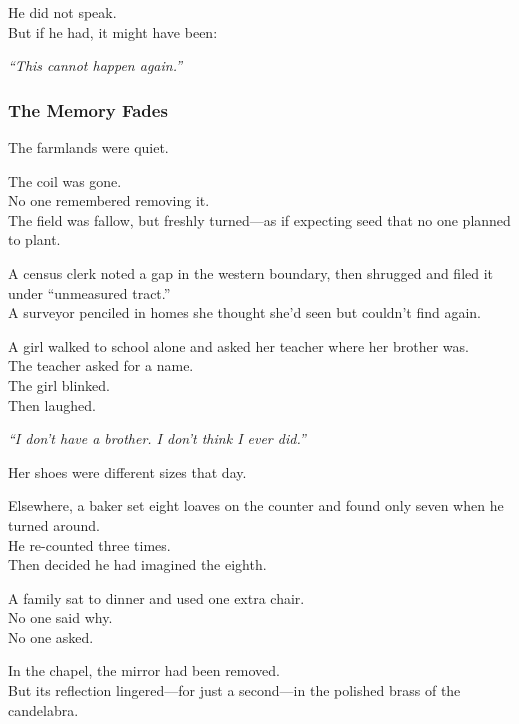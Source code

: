 \documentclass[12pt]{article}
\begin{document}
\vspace{0.5em}
He did not speak.\\
But if he had, it might have been:

\vspace{0.5em}
\textit{``This cannot happen again.''}


\dotfill

\subsubsection{The Memory Fades}

The farmlands were quiet.

\vspace{0.5em}
The coil was gone.\\
No one remembered removing it.\\
The field was fallow, but freshly turned---as if expecting seed that no one planned to plant.

\vspace{0.5em}
A census clerk noted a gap in the western boundary, then shrugged and filed it under ``unmeasured tract.''\\
A surveyor penciled in homes she thought she’d seen but couldn’t find again.

\vspace{0.5em}
A girl walked to school alone and asked her teacher where her brother was.\\
The teacher asked for a name.\\
The girl blinked.\\
Then laughed.

\vspace{0.5em}
\textit{``I don’t have a brother. I don’t think I ever did.''}

\vspace{0.5em}
Her shoes were different sizes that day.

\vspace{0.5em}
Elsewhere, a baker set eight loaves on the counter and found only seven when he turned around.\\
He re-counted three times.\\
Then decided he had imagined the eighth.

\vspace{0.5em}
A family sat to dinner and used one extra chair.\\
No one said why.\\
No one asked.

\vspace{0.5em}
In the chapel, the mirror had been removed.\\
But its reflection lingered---for just a second---in the polished brass of the candelabra.
\end{document}
